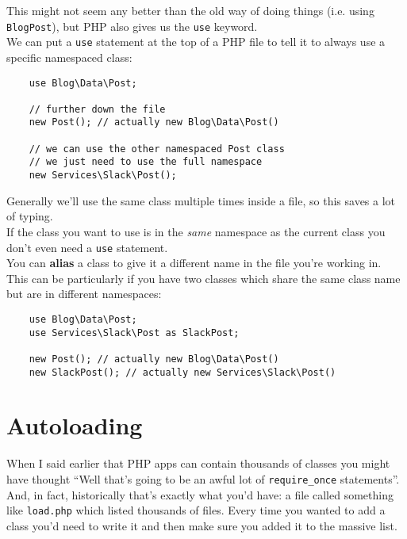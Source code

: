 This might not seem any better than the old way of doing things (i.e. using \texttt{BlogPost}), but PHP also gives us the \texttt{use} keyword.
\\

We can put a \texttt{use} statement at the top of a PHP file to tell it to always use a specific namespaced class:

\begin{verbatim}
    use Blog\Data\Post;

    // further down the file
    new Post(); // actually new Blog\Data\Post()

    // we can use the other namespaced Post class
    // we just need to use the full namespace
    new Services\Slack\Post();
\end{verbatim}

Generally we'll use the same class multiple times inside a file, so this saves a lot of typing.
\\

If the class you want to use is in the \textit{same} namespace as the current class you don't even need a \texttt{use} statement.
\\

You can \textbf{alias} a class to give it a different name in the file you're working in. This can be particularly if you have two classes which share the same class name but are in different namespaces:

\begin{verbatim}
    use Blog\Data\Post;
    use Services\Slack\Post as SlackPost;

    new Post(); // actually new Blog\Data\Post()
    new SlackPost(); // actually new Services\Slack\Post()
\end{verbatim}



\section{Autoloading}

When I said earlier that PHP apps can contain thousands of classes you might have thought ``Well that's going to be an awful lot of \texttt{require\_once} statements''. And, in fact, historically that's exactly what you'd have: a file called something like \texttt{load.php} which listed thousands of files. Every time you wanted to add a class you'd need to write it and then make sure you added it to the massive list.
\\

